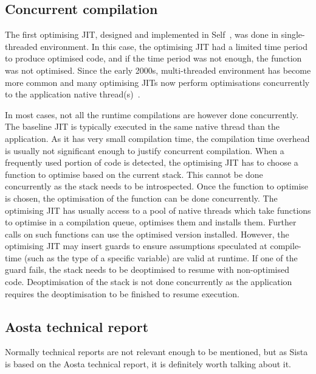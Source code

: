 \documentclass[a4paper,12pt,twoside]{../includes/ThesisStyle}
\begin{document}
\subsection{Concurrent compilation}

The first optimising JIT, designed and implemented in Self~\cite{UrsPHD}, was done in single-threaded environment. In this case, the optimising JIT had a limited time period to produce optimised code, and if the time period was not enough, the function was not optimised. Since the early 2000s, multi-threaded environment has become more common and many optimising JITs now perform optimisations concurrently to the application native thread(s)~\cite{Arn00,Stad12a}.

In most cases, not all the runtime compilations are however done concurrently. The baseline JIT is typically executed in the same native thread than the application. As it has very small compilation time, the compilation time overhead is usually not significant enough to justify concurrent compilation. When a frequently used portion of code is detected, the optimising JIT has to choose a function to optimise based on the current stack. This cannot be done concurrently as the stack needs to be introspected. Once the function to optimise is chosen, the optimisation of the function can be done concurrently. The optimising JIT has usually access to a pool of native threads which take functions to optimise in a compilation queue, optimises them and installs them. Further calls on such functions can use the optimised version installed. However, the optimising JIT may insert guards to ensure assumptions speculated at compile-time (such as the type of a specific variable) are valid at runtime. If one of the guard fails, the stack needs to be deoptimised to resume with non-optimised code. Deoptimisation of the stack is not done concurrently as the application requires the deoptimisation to be finished to resume execution. 

\subsection{Aosta technical report}

Normally technical reports are not relevant enough to be mentioned, but as Sista is based on the Aosta technical report\cite{Mira02c}, it is definitely worth talking about it.
\end{document}
